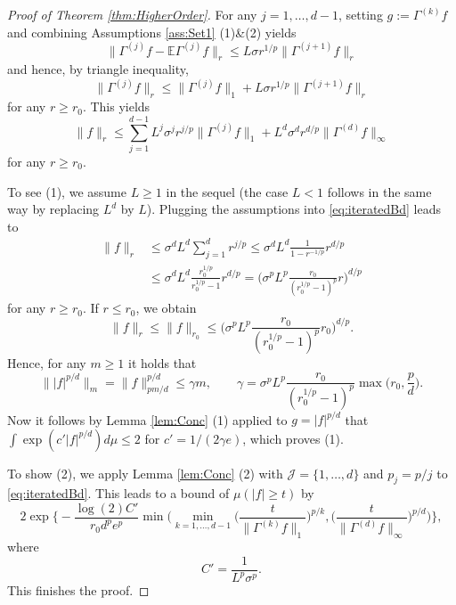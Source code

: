 \documentclass[a4paper,12pt]{amsart}
\numberwithin{equation}{section}
\theoremstyle{remark}
\def\E{{\mathbb E}}
\begin{document}
\begin{proof}[Proof of Theorem \ref{thm:HigherOrder}]
	For any $j = 1, \ldots, d-1$, setting $g :=  \Gamma^{(k)} f$ and combining Assumptions \ref{ass:Set1} (1)\&(2) yields
	\[
	\lVert \Gamma^{(j)} f - \E\Gamma^{(j)} f \rVert_r \le L\sigma r^{1/p} \lVert \Gamma^{(j+1)} f \rVert_r
	\]
	and hence, by triangle inequality,
	\[
	\lVert \Gamma^{(j)} f \rVert_r \le \lVert \Gamma^{(j)} f \rVert_1 + L\sigma r^{1/p} \lVert \Gamma^{(j+1)} f \rVert_r
	\]
	for any $r \ge r_0$. This yields
	\begin{equation}\label{eq:iteratedBd}
		\lVert f \rVert_r \le \sum_{j=1}^{d-1} L^j\sigma^j r^{j/p} \lVert \Gamma^{(j)} f \rVert_1 + L^d\sigma^d r^{d/p} \lVert \Gamma^{(d)} f \rVert_\infty
	\end{equation}
	for any $r \ge r_0$.
	
	To see (1), we assume $L \ge 1$ in the sequel (the case $L < 1$ follows in the same way by replacing $L^d$ by $L$). Plugging the assumptions into \eqref{eq:iteratedBd} leads to
	    \begin{align*}
	    \lVert f \rVert_r &\le \sigma^d L^d \sum_{j=1}^d r^{j/p}
	    \le \sigma^d L^d \frac{1}{1-r^{-1/p}} r^{d/p}\\
	    &\le \sigma^d L^d \frac{r_0^{1/p}}{r_0^{1/p}-1} r^{d/p}
	    = \Big(\sigma^p L^p \frac{r_0}{(r_0^{1/p}-1)^p} r\Big)^{d/p}
	    \end{align*}
	    for any $r \ge r_0$. If $r \le r_0$, we obtain
	    \begin{equation*}
	    \lVert f \rVert_r \le \lVert f \rVert_{r_0} \le \Big(\sigma^p L^p \frac{r_0}{(r_0^{1/p}-1)^p} r_0\Big)^{d/p}.
	    \end{equation*}
	    Hence, for any $m\ge 1$ it holds that
	    \[
	    \lVert |f|^{p/d} \rVert_m = \lVert f \rVert_{pm/d}^{p/d} \le \gamma m,\qquad \gamma = \sigma^p L^p \frac{r_0}{(r_0^{1/p}-1)^p} \max\Big(r_0, \frac{p}{d}\Big).
	    \]
	    Now it follows by Lemma \ref{lem:Conc} (1) applied to $g=|f|^{p/d}$ that $\int \exp(c'|f|^{p/d}) d\mu \le 2$ for $c'=1/(2\gamma e)$, which proves (1).
	
	    To show (2), we apply Lemma \ref{lem:Conc} (2) with $\mathcal{J} = \{1, \ldots, d\}$ and $p_j=p/j$ to \eqref{eq:iteratedBd}. This leads to a bound of $\mu(|f| \ge t)$ by
	    \[
	    2 \exp\Big\{- \frac{\log(2)C'}{r_0d^pe^p} \min\Big(\min_{k=1, \ldots,d-1} \Big(\frac{t}{\lVert \Gamma^{(k)} f \rVert_1}\Big)^{p/k}, \Big(\frac{t}{\lVert \Gamma^{(d)} f \rVert_\infty}\Big)^{p/d}\Big)\Big\},
	    \]
	    where
	    \[
	    C'= \frac{1}{L^p\sigma^p}.
	    \]
	    This finishes the proof.
\end{proof}
\end{document}
